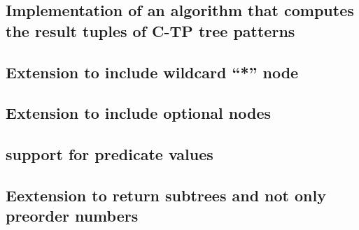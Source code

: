 \documentclass[a4paper,10pt]{article}
\begin{document}
\subsection{Implementation of an algorithm that computes the result tuples of C-TP tree patterns}
\subsection{Extension to include wildcard ``*'' node}
\subsection{Extension to include optional nodes}
\subsection{support for predicate values}
\subsection{Eextension to return subtrees and not only preorder numbers}
\end{document}
